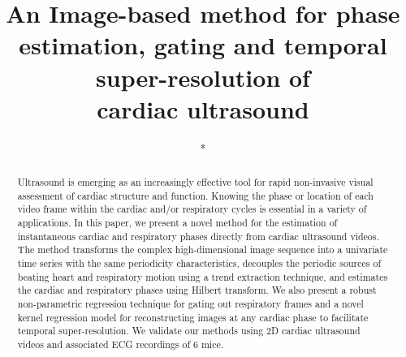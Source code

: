 \documentclass[runningheads,a4paper]{llncs}
\begin{document}
\mainmatter  %

\title{An Image-based method for phase estimation, gating and temporal super-resolution of \\cardiac ultrasound}


%
%

\author{*}
\authorrunning{*}   
\tocauthor{*}
\institute{*}

\maketitle

\begin{abstract}
Ultrasound is emerging as an increasingly effective tool for rapid non-invasive visual assessment of cardiac structure and function. Knowing the phase or location of each video frame within the cardiac and/or respiratory cycles is essential in a variety of applications. In this paper, we present a novel method for the estimation of instantaneous cardiac and respiratory phases directly from cardiac ultrasound videos. The method transforms the complex high-dimensional image sequence into a univariate time series with the same periodicity characteristics, decouples the periodic sources of beating heart and respiratory motion using a trend extraction technique, and estimates the cardiac and respiratory phases using Hilbert transform. We also present a robust non-parametric regression technique for gating out respiratory frames and a novel kernel regression model for reconstructing images at any cardiac phase to facilitate temporal super-resolution. We validate our methods using 2D cardiac ultrasound videos and associated ECG recordings of 6 mice.
\end{abstract}
%
\vspace{-0.5cm}
\end{document}

